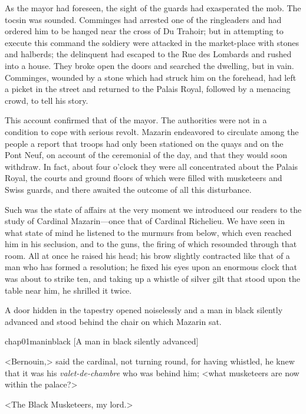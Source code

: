 As the mayor had foreseen, the sight of the guards had exasperated the mob. The tocsin was sounded. Comminges had arrested one of the ringleaders and had ordered him to be hanged near the cross of Du Trahoir; but in attempting to execute this command the soldiery were attacked in the market-place with stones and halberds; the delinquent had escaped to the Rue des Lombards and rushed into a house. They broke open the doors and searched the dwelling, but in vain. Comminges, wounded by a stone which had struck him on the forehead, had left a picket in the street and returned to the Palais Royal, followed by a menacing crowd, to tell his story.

This account confirmed that of the mayor. The authorities were not in a condition to cope with serious revolt. Mazarin endeavored to circulate among the people a report that troops had only been stationed on the quays and on the Pont Neuf, on account of the ceremonial of the day, and that they would soon withdraw. In fact, about four o'clock they were all concentrated about the Palais Royal, the courts and ground floors of which were filled with musketeers and Swiss guards, and there awaited the outcome of all this disturbance.

Such was the state of affairs at the very moment we introduced our readers to the study of Cardinal Mazarin—once that of Cardinal Richelieu. We have seen in what state of mind he listened to the murmurs from below, which even reached him in his seclusion, and to the guns, the firing of which resounded through that room. All at once he raised his head; his brow slightly contracted like that of a man who has formed a resolution; he fixed his eyes upon an enormous clock that was about to strike ten, and taking up a whistle of silver gilt that stood upon the table near him, he shrilled it twice.

A door hidden in the tapestry opened noiselessly and a man in black silently advanced and stood behind the chair on which Mazarin sat.

\begin{bwbigpic}
	[\basicscale] 
	{chap01maninblack}
	[A man in black silently advanced]
\end{bwbigpic}

<Bernouin,> said the cardinal, not turning round, for having whistled, he knew that it was his \textit{valet-de-chambre} who was behind him; <what musketeers are now within the palace?>

<The Black Musketeers, my lord.>

